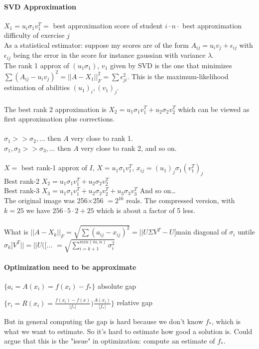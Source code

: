 \documentclass[10pt]{report}
\begin{document}
\paragraph{SVD Approximation} $X_1 = u_i\sigma_1 v_1^T =$ best approximation score of student $i \cdot n \cdot$ best approximation difficulty of exercise $j$\\
As a statistical estimator: suppose my scores are of the form $A_{ij} = u_i v_j + \epsilon_{ij}$ with $\epsilon_{ij}$ being the error in the score for instance gaussian with variance $\lambda$.\\
The rank 1 approx of $(u_1\sigma_1)$, $v_1$ given by SVD is the one that minimizes $\sum (A_{ij} - u_iv_j)^2 = ||A-X_1||_F^2 = \sum \epsilon_{ji}^2$. This is the maximum-likelihood estimation of abilities $(u_1)_i, (v_1)_j$.\\\\
The best rank 2 approximation is $X_2 = u_1\sigma_1 v_1^T + u_2\sigma_2 v_2^T$ which can be viewed as first approximation plus corrections.\\\\
$\sigma_1 >> \sigma_2,\ldots$ then $A$ very close to rank 1.\\
$\sigma_1, \sigma_2 >> \sigma_3,\ldots$ then $A$ very close to rank 2, and so on.
\paragraph{} $X =$ best rank-1 approx of $I$, $X = u_1\sigma_1 v_1^T$, $x_{ij} = (u_1)_j \sigma_1 (v_1^T)_j$\\
Best rank-2 $X_2 = u_1\sigma_1 v_1^T + u_2 \sigma_2 v_2^T$\\
Best rank-3 $X_3 = u_1\sigma_1 v_1^T + u_2 \sigma_2 v_2^T + u_3 \sigma_3 v_3^T$
And so on\ldots\\
The original image was 256$\times$256 $= 2^{16}$ reals. The compressed version, with $k = 25$ we have $256\cdot5\cdot2 + 25$ which is about a factor of 5 less.\\\\
What is $||A - X_k||_F = \sqrt{\sum (a_{ij} - x_{ij})^2} = ||U\Sigma V^T - U[$main diagonal of $\sigma_i$ untile $\sigma_k] V^T|| = ||U([\ldots$ %
$= \sqrt{\sum_{i=k+1}^{min(m,n)} \sigma_i^2}$
\paragraph{Optimization need to be approximate} \begin{list}{}{}
	\item $\{a_i = A(x_i) = f(x_i) - f_*\}$ absolute gap
	\item $\{r_i = R(x_i) = \frac{f(x_i) - f(x)}{|f_*|} ) \frac{A(x_i)}{|f_*|}\}$ relative gap
\end{list}
But in general computing the gap is hard because we don't know $f_*$, which is what we want to estimate. So it's hard to estimate how good a solution is. Could argue that this is the "issue" in optimization: compute an estimate of $f_*$.
\end{document}
